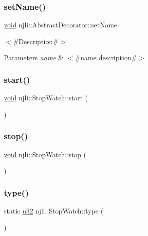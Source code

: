 \subsubsection{\texorpdfstring{set\+Name()}{setName()}}
{\footnotesize\ttfamily \mbox{\hyperlink{_thread_8h_af1e856da2e658414cb2456cb6f7ebc66}{void}} njli\+::\+Abstract\+Decorator\+::set\+Name}

$<$\#\+Description\#$>$


\begin{DoxyParams}{Parameters}
{\em name} & $<$\#name description\#$>$ \\
\hline
\end{DoxyParams}
\mbox{\label{classnjli_1_1_stop_watch_a86c10437140b1a885228b17dca3697d4}} 
\subsubsection{\texorpdfstring{start()}{start()}}
{\footnotesize\ttfamily \mbox{\hyperlink{_thread_8h_af1e856da2e658414cb2456cb6f7ebc66}{void}} njli\+::\+Stop\+Watch\+::start (\begin{DoxyParamCaption}{ }\end{DoxyParamCaption})}

\mbox{\label{classnjli_1_1_stop_watch_a611f4cc1cd65b7099db654f1052c6910}} 
\subsubsection{\texorpdfstring{stop()}{stop()}}
{\footnotesize\ttfamily \mbox{\hyperlink{_thread_8h_af1e856da2e658414cb2456cb6f7ebc66}{void}} njli\+::\+Stop\+Watch\+::stop (\begin{DoxyParamCaption}{ }\end{DoxyParamCaption})}

\mbox{\label{classnjli_1_1_stop_watch_ae0c8a96a7465847dd0b739f307ca71c6}} 
\subsubsection{\texorpdfstring{type()}{type()}}
{\footnotesize\ttfamily static \mbox{\hyperlink{_util_8h_a10e94b422ef0c20dcdec20d31a1f5049}{u32}} njli\+::\+Stop\+Watch\+::type (\begin{DoxyParamCaption}{ }\end{DoxyParamCaption})\hspace{0.3cm}{\ttfamily [static]}}

